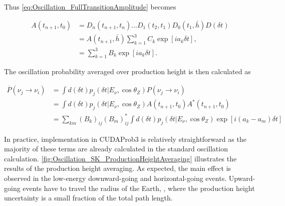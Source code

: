 Thus \autoref{eq:Oscillation_FullTransitionAmplitude} becomes

\begin{equation}
  \begin{split}
    A(t_{n+1},t_{0}) &= D_{n}(t_{n+1},t_{n})...D_{1}(t_{2},t_{1})D_{0}(t_{1},\bar{h})D(\delta t) \\
    &= A(t_{n+1},\bar{h}) \sum_{k=1}^{3} C_{k} \exp[ia_{k} \delta t], \\
    &= \sum_{k=1}^{3} B_{k} \exp[ia_{k} \delta t].
  \end{split}
\end{equation}

The oscillation probability averaged over production height is then calculated as

\begin{equation}
  \begin{split}
    \overline P(\nu_{j} \rightarrow \nu_{i}) &= \int d(\delta t) p_{j}(\delta t|E_{\nu}, \cos\theta_{Z}) P(\nu_{j} \rightarrow \nu_{i}) \\
    &= \int d(\delta t) p_{j}(\delta t|E_{\nu}, \cos\theta_{Z})	A(t_{n+1},t_{0}) A^{*}(t_{n+1},t_{0}) \\
    &= \sum_{km} (B_{k})_{ij} (B_{m})^{*}_{ij} \int d(\delta t) p_{j}(\delta t|E_{\nu}, \cos\theta_{Z}) \exp[i(a_{k}-a_{m})\delta t]
  \end{split}
\end{equation}

In practice, implementation in CUDAProb3 \cite{cudaprob3} is relatively straightforward as the majority of these terms are already calculated in the standard oscillation calculation. \autoref{fig:Oscillation_SK_ProductionHeightAveraging} illustrates the results of the production height averaging. As expected, the main effect is observed in the low-energy downward-going and horizontal-going events. Upward-going events have to travel the radius of the Earth, , where the production height uncertainty is a small fraction of the total path length. 

